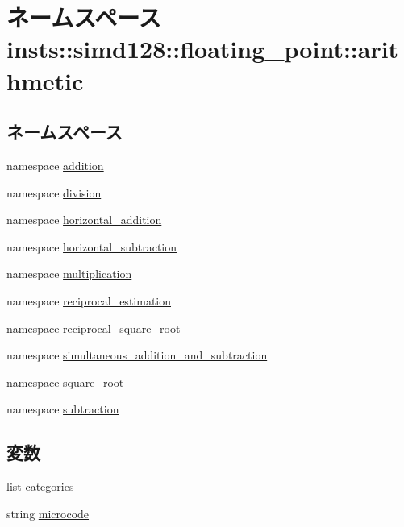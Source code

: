 \hypertarget{namespaceinsts_1_1simd128_1_1floating__point_1_1arithmetic}{
\section{ネームスペース insts::simd128::floating\_\-point::arithmetic}
\label{namespaceinsts_1_1simd128_1_1floating__point_1_1arithmetic}
}
\subsection*{ネームスペース}
\begin{DoxyCompactItemize}
\item 
namespace \hyperlink{namespaceinsts_1_1simd128_1_1floating__point_1_1arithmetic_1_1addition}{addition}
\item 
namespace \hyperlink{namespaceinsts_1_1simd128_1_1floating__point_1_1arithmetic_1_1division}{division}
\item 
namespace \hyperlink{namespaceinsts_1_1simd128_1_1floating__point_1_1arithmetic_1_1horizontal__addition}{horizontal\_\-addition}
\item 
namespace \hyperlink{namespaceinsts_1_1simd128_1_1floating__point_1_1arithmetic_1_1horizontal__subtraction}{horizontal\_\-subtraction}
\item 
namespace \hyperlink{namespaceinsts_1_1simd128_1_1floating__point_1_1arithmetic_1_1multiplication}{multiplication}
\item 
namespace \hyperlink{namespaceinsts_1_1simd128_1_1floating__point_1_1arithmetic_1_1reciprocal__estimation}{reciprocal\_\-estimation}
\item 
namespace \hyperlink{namespaceinsts_1_1simd128_1_1floating__point_1_1arithmetic_1_1reciprocal__square__root}{reciprocal\_\-square\_\-root}
\item 
namespace \hyperlink{namespaceinsts_1_1simd128_1_1floating__point_1_1arithmetic_1_1simultaneous__addition__and__subtraction}{simultaneous\_\-addition\_\-and\_\-subtraction}
\item 
namespace \hyperlink{namespaceinsts_1_1simd128_1_1floating__point_1_1arithmetic_1_1square__root}{square\_\-root}
\item 
namespace \hyperlink{namespaceinsts_1_1simd128_1_1floating__point_1_1arithmetic_1_1subtraction}{subtraction}
\end{DoxyCompactItemize}
\subsection*{変数}
\begin{DoxyCompactItemize}
\item 
list \hyperlink{namespaceinsts_1_1simd128_1_1floating__point_1_1arithmetic_a273cf0f1630af14c1582f05e53354a55}{categories}
\item 
string \hyperlink{namespaceinsts_1_1simd128_1_1floating__point_1_1arithmetic_a770f11a173e99389a8802f0107ed8f52}{microcode}
\end{DoxyCompactItemize}


